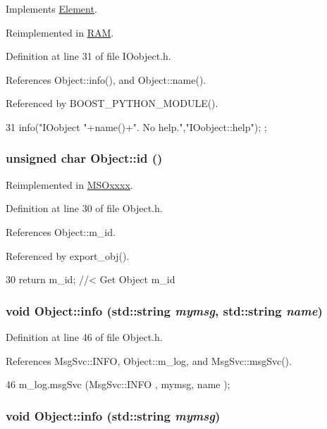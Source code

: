 Implements \hyperlink{classElement_a32c0de27acb08e17251cef88c3e9303a}{Element}.

Reimplemented in \hyperlink{classRAM_ac1e78007fabee045f00f342a907fa25c}{RAM}.

Definition at line 31 of file IOobject.h.

References Object::info(), and Object::name().

Referenced by BOOST\_\-PYTHON\_\-MODULE().


\begin{DoxyCode}
31 { info("IOobject "+name()+". No help.","IOobject::help"); };
\end{DoxyCode}
\hypertarget{classObject_af99145335cc61ff6e2798ea17db009d2}{
\subsubsection[{id}]{\setlength{\rightskip}{0pt plus 5cm}unsigned char Object::id ()}}
\label{classObject_af99145335cc61ff6e2798ea17db009d2}


Reimplemented in \hyperlink{classMSOxxxx_a0f14b23d31d8e7647184e99a89600cc3}{MSOxxxx}.

Definition at line 30 of file Object.h.

References Object::m\_\-id.

Referenced by export\_\-obj().


\begin{DoxyCode}
30 { return m_id;         } //< Get Object m_id 
\end{DoxyCode}
\hypertarget{classObject_a1ca123253dfd30fc28b156f521dcbdae}{
\subsubsection[{info}]{\setlength{\rightskip}{0pt plus 5cm}void Object::info (std::string {\em mymsg}, \/  std::string {\em name})}}
\label{classObject_a1ca123253dfd30fc28b156f521dcbdae}


Definition at line 46 of file Object.h.

References MsgSvc::INFO, Object::m\_\-log, and MsgSvc::msgSvc().


\begin{DoxyCode}
46 { m_log.msgSvc (MsgSvc::INFO    , mymsg, name ); }
\end{DoxyCode}
\hypertarget{classObject_a644fd329ea4cb85f54fa6846484b84a8}{
\subsubsection[{info}]{\setlength{\rightskip}{0pt plus 5cm}void Object::info (std::string {\em mymsg})}}
\label{classObject_a644fd329ea4cb85f54fa6846484b84a8}


